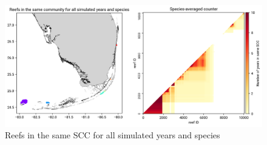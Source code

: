 \documentclass[preprint,12pt,authoryear]{elsarticle}
\begin{document}
\begin{figure}[h!]
    \centering
    \includegraphics[width=\textwidth]{figures/mean_counter.png}
    \caption{Reefs in the same SCC for all simulated years and species}\label{fig:mean_counter}
\end{figure}
\end{document}

